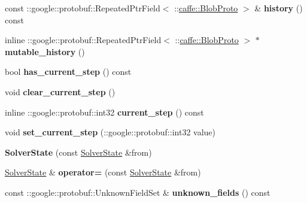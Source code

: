 \begin{DoxyCompactItemize}
const \+::google\+::protobuf\+::\+Repeated\+Ptr\+Field$<$ \+::\mbox{\hyperlink{classcaffe_1_1_blob_proto}{caffe\+::\+Blob\+Proto}} $>$ \& {\bfseries history} () const
\item 
\mbox{\label{classcaffe_1_1_solver_state_a2898e09ddb747e14623de6294cfebbfd}} 
inline \+::google\+::protobuf\+::\+Repeated\+Ptr\+Field$<$ \+::\mbox{\hyperlink{classcaffe_1_1_blob_proto}{caffe\+::\+Blob\+Proto}} $>$ $\ast$ {\bfseries mutable\+\_\+history} ()
\item 
\mbox{\label{classcaffe_1_1_solver_state_aaff55a8c2e95ffd00f32014cb1b3fb6f}} 
bool {\bfseries has\+\_\+current\+\_\+step} () const
\item 
\mbox{\label{classcaffe_1_1_solver_state_ad64551e9bac605fd329ffcf6ac56790c}} 
void {\bfseries clear\+\_\+current\+\_\+step} ()
\item 
\mbox{\label{classcaffe_1_1_solver_state_ace069978b9abe3005a01aec7650dd849}} 
inline \+::google\+::protobuf\+::int32 {\bfseries current\+\_\+step} () const
\item 
\mbox{\label{classcaffe_1_1_solver_state_ad6069ae4e6fddf0e72611b096e2a8148}} 
void {\bfseries set\+\_\+current\+\_\+step} (\+::google\+::protobuf\+::int32 value)
\item 
\mbox{\label{classcaffe_1_1_solver_state_a4390350248eeb1f1f6d817e2705048c7}} 
{\bfseries Solver\+State} (const \mbox{\hyperlink{classcaffe_1_1_solver_state}{Solver\+State}} \&from)
\item 
\mbox{\label{classcaffe_1_1_solver_state_a92186cf43fc6f3883e5191a06ef97315}} 
\mbox{\hyperlink{classcaffe_1_1_solver_state}{Solver\+State}} \& {\bfseries operator=} (const \mbox{\hyperlink{classcaffe_1_1_solver_state}{Solver\+State}} \&from)
\item 
\mbox{\label{classcaffe_1_1_solver_state_a80eb1ff8d93a516aaa4502fefef3e504}} 
const \+::google\+::protobuf\+::\+Unknown\+Field\+Set \& {\bfseries unknown\+\_\+fields} () const
\item 

\end{DoxyCompactItemize}
